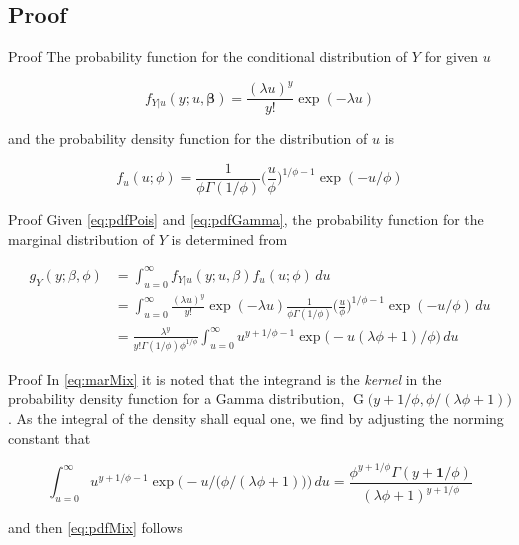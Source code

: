 \documentclass[aspectratio=169,handout]{beamer}
\DeclareMathOperator{\G}{G}
\begin{document}
\hypertarget{proof}{%
\subsection{Proof}\label{proof}}

\begin{frame}{Proof}
The probability function for the conditional distribution of \(Y\) for
given \(u\)

\begin{equation}\label{eq:pdfPois}
  f_{Y|u}(y;u,\boldsymbol{\beta})=\frac{(\lambda u)^{y}}{y!}\exp(-\lambda u)
\end{equation}

and the probability density function for the distribution of \(u\) is

\begin{equation} \label{eq:pdfGamma}
  f_{u}(u;\phi)=\frac{1}{\phi \Gamma(1/\phi)} \bigg(\frac{u}{\phi}\bigg)^{1/\phi-1} \exp (-u/\phi)
\end{equation}
\end{frame}

\begin{frame}{Proof}
\protect\hypertarget{proof-1}{}
Given \eqref{eq:pdfPois} and \eqref{eq:pdfGamma}, the probability
function for the marginal distribution of \(Y\) is determined from

\begin{equation} \label{eq:marMix}
  \begin{aligned}
    g_{Y}(y;\beta,\phi)&=\int_{u=0}^\infty f_{Y|u}(y;u,\beta) f_{u}(u;\phi) \,du \\
    &=\int_{u=0}^\infty \frac{(\lambda u)^y}{y!} \exp (-\lambda u) \frac{1}{\phi \Gamma(1/\phi)} \bigg(\frac{u}{\phi}\bigg)^{1/\phi-1} \exp (-u /\phi) \,du\\
    &=\frac{\lambda^{y}}{y!\Gamma(1/\phi)\phi^{1/\phi}} \int_{u=0}^\infty u^{y+1/\phi-1} \exp \big(-u(\lambda \phi+1)/\phi\big) \,du
  \end{aligned}
\end{equation}
\end{frame}

\begin{frame}{Proof}
\protect\hypertarget{proof-2}{}
In \eqref{eq:marMix} it is noted that the integrand is the \emph{kernel}
in the probability density function for a Gamma distribution,
\(\G\big(y+1/\phi,\phi/(\lambda \phi+1)\big)\). As the integral of the
density shall equal one, we find by adjusting the norming constant that

\begin{equation}
  \int_{u=0}^\infty  u^{ y+ 1/\phi-1} \exp \Big(- u/\big(\phi/( \lambda \phi+1)\big)\Big) \,du = \frac{\phi^{ y+ 1/\phi}\Gamma( y+\boldsymbol 1/\phi)}{( \lambda \phi + 1)^{y+1/\phi}}
\end{equation}

and then \eqref{eq:pdfMix} follows
\end{frame}
\end{document}
